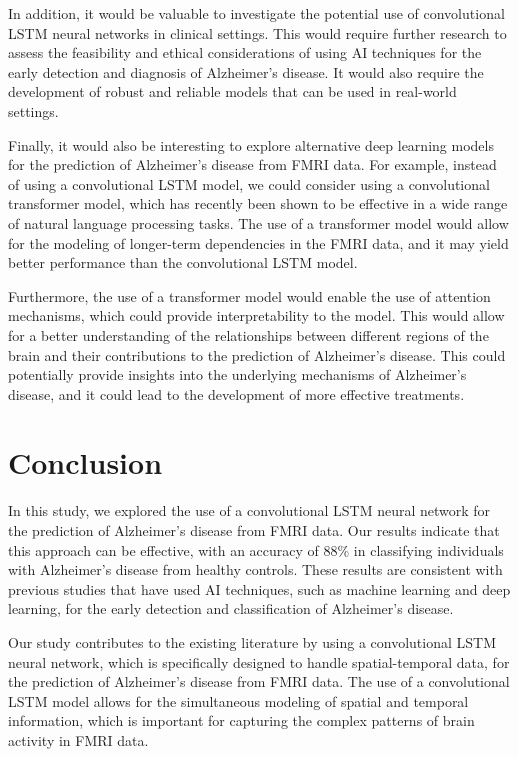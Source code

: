 \documentclass[10pt]{article}
\begin{document}
	In addition, it would be valuable to investigate the potential use of convolutional LSTM neural networks in clinical settings. This would require further research to assess the feasibility and ethical considerations of using AI techniques for the early detection and diagnosis of Alzheimer's disease. It would also require the development of robust and reliable models that can be used in real-world settings.

	Finally, it would also be interesting to explore alternative deep learning models for the prediction of Alzheimer's disease from FMRI data. For example, instead of using a convolutional LSTM model, we could consider using a convolutional transformer model, which has recently been shown to be effective in a wide range of natural language processing tasks. The use of a transformer model would allow for the modeling of longer-term dependencies in the FMRI data, and it may yield better performance than the convolutional LSTM model.

	Furthermore, the use of a transformer model would enable the use of attention mechanisms, which could provide interpretability to the model. This would allow for a better understanding of the relationships between different regions of the brain and their contributions to the prediction of Alzheimer's disease. This could potentially provide insights into the underlying mechanisms of Alzheimer's disease, and it could lead to the development of more effective treatments.

	\section{Conclusion}

	In this study, we explored the use of a convolutional LSTM neural network for the prediction of Alzheimer's disease from FMRI data. Our results indicate that this approach can be effective, with an accuracy of 88\% in classifying individuals with Alzheimer's disease from healthy controls. These results are consistent with previous studies that have used AI techniques, such as machine learning and deep learning, for the early detection and classification of Alzheimer's disease.

	Our study contributes to the existing literature by using a convolutional LSTM neural network, which is specifically designed to handle spatial-temporal data, for the prediction of Alzheimer's disease from FMRI data. The use of a convolutional LSTM model allows for the simultaneous modeling of spatial and temporal information, which is important for capturing the complex patterns of brain activity in FMRI data.
\end{document}
